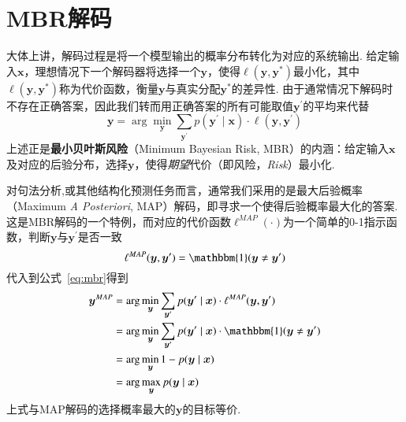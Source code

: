 \section{MBR解码}\label{sec:mbr-decoding}
大体上讲，解码过程是将一个模型输出的概率分布转化为对应的系统输出.
给定输入$\boldsymbol{x}$，理想情况下一个解码器将选择一个$\boldsymbol{y}$，使得$\ell(\boldsymbol{y},\boldsymbol{y}^{\ast})$最小化，其中$\ell(\boldsymbol{y},\boldsymbol{y}^{\ast})$称为代价函数，衡量$\boldsymbol{y}$与真实分配$\boldsymbol{y}^{\ast}$的差异性.
由于通常情况下解码时不存在正确答案，因此我们转而用正确答案的所有可能取值$\boldsymbol{y}^{\prime}$的平均来代替
\begin{equation}
  \label{eq:mbr}
  \boldsymbol{y}= \arg\min_{\boldsymbol{y}}\sum_{\boldsymbol{y}^{\prime}}p(\boldsymbol{y}^{\prime}\mid\boldsymbol{x})\cdot\ell(\boldsymbol{y},\boldsymbol{y}^{\prime})
\end{equation}
上述正是\textbf{最小贝叶斯风险}（Minimum Bayesian Risk, MBR）的内涵：给定输入$\boldsymbol{x}$及对应的后验分布，选择$\boldsymbol{y}$，使得\textit{期望}代价（即风险，\textit{Risk}）最小化\citep{stoyanov-eisner-2012-minimum}.

对句法分析,或其他结构化预测任务而言，通常我们采用的是最大后验概率（Maximum \textit{A Posteriori}, MAP）解码，即寻求一个使得后验概率最大化的答案.
这是MBR解码的一个特例，而对应的代价函数$\ell^{MAP}(\cdot)$为一个简单的0-1指示函数，判断$\boldsymbol{y}$与$\boldsymbol{y}^{\prime}$是否一致
\begin{equation}
  \ell^{MAP}(\boldsymbol{y},\boldsymbol{y}^{\prime}) = \mathbbm{1}(\boldsymbol{y}\neq\boldsymbol{y}^{\prime})
\end{equation}
代入到公式~\ref{eq:mbr}得到
\begin{equation}
  \label{eq:map}
  \begin{split}
    \boldsymbol{y}^{MAP}&= \arg\min_{\boldsymbol{y}}\sum_{\boldsymbol{y}^{\prime}}p(\boldsymbol{y}^{\prime}\mid\boldsymbol{x})\cdot\ell^{MAP}(\boldsymbol{y},\boldsymbol{y}^{\prime})\\
    &=\arg\min_{\boldsymbol{y}}\sum_{\boldsymbol{y}^{\prime}}p(\boldsymbol{y}^{\prime}\mid\boldsymbol{x})\cdot\mathbbm{1}(\boldsymbol{y}\neq\boldsymbol{y}^{\prime})\\
    &=\arg\min_{\boldsymbol{y}} 1-p(\boldsymbol{y}\mid\boldsymbol{x})\\
    &=\arg\max_{\boldsymbol{y}}p(\boldsymbol{y}\mid\boldsymbol{x})
  \end{split}
\end{equation}
上式与MAP解码的选择概率最大的$\boldsymbol{y}$的目标等价.


